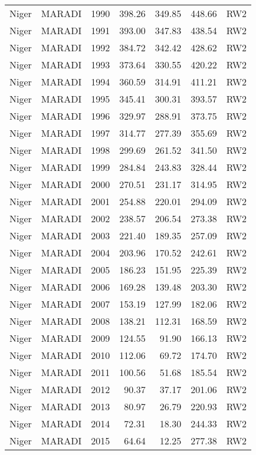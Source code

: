 \begin{longtable}{lllrrrl}
  Niger & MARADI & 1990 & 398.26 & 349.85 & 448.66 & RW2 \\ 
  Niger & MARADI & 1991 & 393.00 & 347.83 & 438.54 & RW2 \\ 
  Niger & MARADI & 1992 & 384.72 & 342.42 & 428.62 & RW2 \\ 
  Niger & MARADI & 1993 & 373.64 & 330.55 & 420.22 & RW2 \\ 
  Niger & MARADI & 1994 & 360.59 & 314.91 & 411.21 & RW2 \\ 
  Niger & MARADI & 1995 & 345.41 & 300.31 & 393.57 & RW2 \\ 
  Niger & MARADI & 1996 & 329.97 & 288.91 & 373.75 & RW2 \\ 
  Niger & MARADI & 1997 & 314.77 & 277.39 & 355.69 & RW2 \\ 
  Niger & MARADI & 1998 & 299.69 & 261.52 & 341.50 & RW2 \\ 
  Niger & MARADI & 1999 & 284.84 & 243.83 & 328.44 & RW2 \\ 
  Niger & MARADI & 2000 & 270.51 & 231.17 & 314.95 & RW2 \\ 
  Niger & MARADI & 2001 & 254.88 & 220.01 & 294.09 & RW2 \\ 
  Niger & MARADI & 2002 & 238.57 & 206.54 & 273.38 & RW2 \\ 
  Niger & MARADI & 2003 & 221.40 & 189.35 & 257.09 & RW2 \\ 
  Niger & MARADI & 2004 & 203.96 & 170.52 & 242.61 & RW2 \\ 
  Niger & MARADI & 2005 & 186.23 & 151.95 & 225.39 & RW2 \\ 
  Niger & MARADI & 2006 & 169.28 & 139.48 & 203.30 & RW2 \\ 
  Niger & MARADI & 2007 & 153.19 & 127.99 & 182.06 & RW2 \\ 
  Niger & MARADI & 2008 & 138.21 & 112.31 & 168.59 & RW2 \\ 
  Niger & MARADI & 2009 & 124.55 & 91.90 & 166.13 & RW2 \\ 
  Niger & MARADI & 2010 & 112.06 & 69.72 & 174.70 & RW2 \\ 
  Niger & MARADI & 2011 & 100.56 & 51.68 & 185.54 & RW2 \\ 
  Niger & MARADI & 2012 & 90.37 & 37.17 & 201.06 & RW2 \\ 
  Niger & MARADI & 2013 & 80.97 & 26.79 & 220.93 & RW2 \\ 
  Niger & MARADI & 2014 & 72.31 & 18.30 & 244.33 & RW2 \\ 
  Niger & MARADI & 2015 & 64.64 & 12.25 & 277.38 & RW2 \\ 

\end{longtable}

